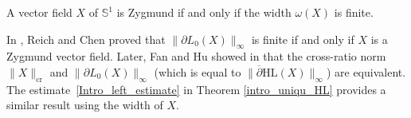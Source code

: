 \begin{cor}\label{Cor_diaf_inf}
A vector field $X$ of $\mathbb{S}^1$ is Zygmund if and only if the width $\omega(X)$ is finite.
\end{cor}

In \cite{Extension_with_bounded_derivative}, Reich and Chen proved that \(\lVert \partial L_0(X) \rVert_{\infty} \) is finite if and only if \(X \) is a Zygmund vector field. Later, Fan and Hu showed in \cite{FanJun} that the cross-ratio norm~\(\lVert X \rVert_\mathrm{cr} \) and \(\lVert \partial L_0(X) \rVert_{\infty} \) (which is equal to \(\lVert \overline{\partial} \mathrm{HL}(X) \rVert_{\infty} \)) are equivalent. The estimate~\eqref{Intro_left_estimate} in Theorem \ref{intro_uniqu_HL} provides a similar result using the width of \(X \).

